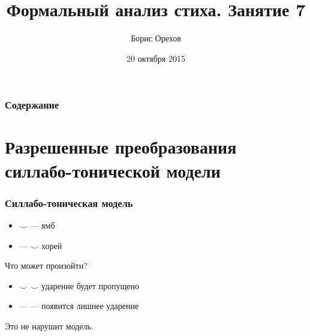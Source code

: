 \documentclass{beamer}
\title[Занятие 7]{Формальный анализ стиха. Занятие 7} %
\author{Борис Орехов} %
\institute[НИУ ВШЭ] %
{
НИУ Высшая школа экономики \\ %
\medskip
\textit{nevmenandr@gmail.com} %
}
\date{20 октября 2015} %
\begin{document}
\begin{frame}
\titlepage %
\end{frame}



\begin{frame}
\frametitle{Содержание}  %
\tableofcontents %
\end{frame}


\section[Разрешенные преобразования]{Разрешенные преобразования силлабо-тонической модели}\label{sec:rusyl}

\begin{frame}
\frametitle{Силлабо-тоническая модель}

\begin{itemize}
\item  $\smile$ --- ямб
\item  --- $\smile$ хорей
\end{itemize}

Что может произойти?

\begin{itemize}
\item  $\smile$ $\smile$ ударение будет пропущено
\item  --- --- появится лишнее ударение
\end{itemize}

Это не нарушит модель.

\end{frame}



\end{document}
